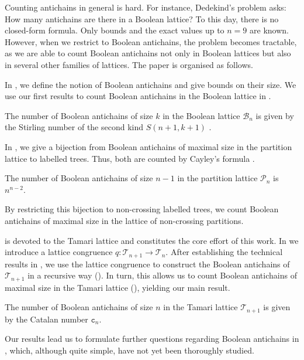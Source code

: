 \documentclass{preprint}
\newcommand{\cB}{\mathcal{B}}
\newcommand{\cP}{\mathcal{P}}
\newcommand{\cT}{\mathcal{T}}
\theoremstyle{definition}
\begin{document}
Counting antichains in general is hard. For instance, Dedekind's problem \cite{dedekind1897decomposition} asks: How many antichains are there in a Boolean lattice? To this day, there is no closed-form formula. Only bounds \cite{kleitman1969dedekind} and the exact values up to $n = 9$ \cite[Entry A000372]{oeis2025dedekind} are known. However, when we restrict to Boolean antichains, the problem becomes tractable, as we are able to count Boolean antichains not only in Boolean lattices but also in several other families of lattices. The paper is organised as follows.

In , we define the notion of Boolean antichains and give bounds on their size.
We use our first results to count Boolean antichains in the Boolean lattice in .
\begin{theorem*}
    The number of Boolean antichains of size $k$ in the Boolean lattice $\cB_n$ is given by the Stirling number of the second kind $S(n+1,k+1)$ \cite{stirling1749differential}.
\end{theorem*}
In , we give a bijection from Boolean antichains of maximal size in the partition lattice to labelled trees. Thus, both are counted by Cayley's formula \cite{Cayley1897trees}.
\begin{theorem*}
    The number of Boolean antichains of size $n-1$ in the partition lattice $\cP_n$ is $n^{n-2}$.
\end{theorem*}
By restricting this bijection to non-crossing labelled trees, we count Boolean antichains of maximal size in the lattice of non-crossing partitions.

 is devoted to the Tamari lattice and constitutes the core effort of this work. 
In  we introduce a lattice congruence $q:\cT_{n+1}\to \cT_{n}$. After establishing the technical results in , we use the lattice congruence to construct the Boolean antichains of $\cT_{n+1}$ in a recursive way (). In turn, this allows us to count Boolean antichains of maximal size in the Tamari lattice (), yielding our main result.
\begin{theorem*}
    The number of Boolean antichains of size $n$ in the Tamari lattice $\cT_{n+1}$ is given by the Catalan number $\mathtt{c}_n$.
\end{theorem*}
Our results lead us to formulate further questions regarding Boolean antichains in , which, although quite simple, have not yet been thoroughly studied.
\end{document}
